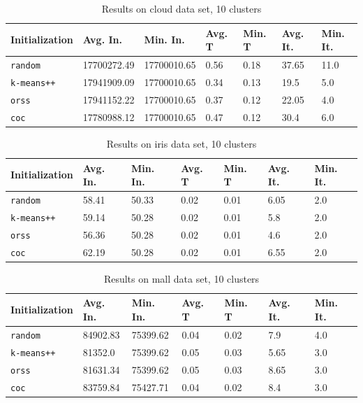 \documentclass[12pt]{article}
\begin{document}
		\begin{table}[p]
			\begin{center}
				\begin{tabular}{|l|l|l|l|l|l|l|}
					\hline
					Initialization & Avg. In. & Min. In. & Avg. T & Min. T & Avg. It. & Min. It.\\\hline
					\texttt{random} & 17700272.49 & 17700010.65 & 0.56 & 0.18 & 37.65 & 11.0\\\hline
					\texttt{k-means++} & 17941909.09 & 17700010.65 & 0.34 & 0.13 & 19.5 & 5.0\\\hline
					\texttt{orss} & 17941152.22 & 17700010.65 & 0.37 & 0.12 & 22.05 & 4.0\\\hline
					\texttt{coc} & 17780988.12 & 17700010.65 & 0.47 & 0.12 & 30.4 & 6.0\\\hline
				\end{tabular}
				\caption{Results on cloud data set, 10 clusters}
				\label{tbl:cloud10}
			\end{center}
		\end{table}

		\begin{table}[p]
			\begin{center}
				\begin{tabular}{|l|l|l|l|l|l|l|}
					\hline
					Initialization & Avg. In. & Min. In. & Avg. T & Min. T & Avg. It. & Min. It.\\\hline
					\texttt{random} & 58.41 & 50.33 & 0.02 & 0.01 & 6.05 & 2.0\\\hline
					\texttt{k-means++} & 59.14 & 50.28 & 0.02 & 0.01 & 5.8 & 2.0\\\hline
					\texttt{orss} & 56.36 & 50.28 & 0.02 & 0.01 & 4.6 & 2.0\\\hline
					\texttt{coc} & 62.19 & 50.28 & 0.02 & 0.01 & 6.55 & 2.0\\\hline
				\end{tabular}
				\caption{Results on iris data set, 10 clusters}
				\label{tbl:iris10}
			\end{center}
		\end{table}

		\begin{table}[p]
			\begin{center}
				\begin{tabular}{|l|l|l|l|l|l|l|}
					\hline
					Initialization & Avg. In. & Min. In. & Avg. T & Min. T & Avg. It. & Min. It.\\\hline
					\texttt{random} & 84902.83 & 75399.62 & 0.04 & 0.02 & 7.9 & 4.0\\\hline
					\texttt{k-means++} & 81352.0 & 75399.62 & 0.05 & 0.03 & 5.65 & 3.0\\\hline
					\texttt{orss} & 81631.34 & 75399.62 & 0.05 & 0.03 & 8.65 & 3.0\\\hline
					\texttt{coc} & 83759.84 & 75427.71 & 0.04 & 0.02 & 8.4 & 3.0\\\hline
				\end{tabular}
				\caption{Results on mall data set, 10 clusters}
				\label{tbl:mall10}
			\end{center}
		\end{table}
\end{document}
